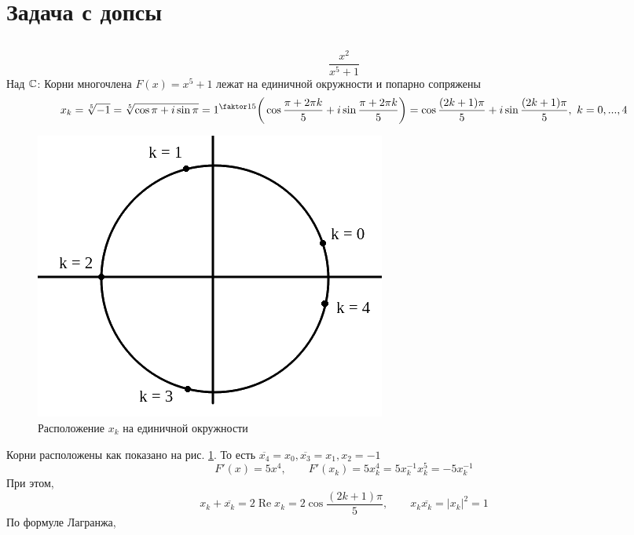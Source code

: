 \section{Задача с допсы}

\subsection{}

$$ \frac{x^2}{x^5 + 1} $$
Над $ \mathbb{C} $:
Корни многочлена $ F(x) = x^5 + 1 $ лежат на единичной окружности и попарно сопряжены
$$ x_k = \sqrt[5]{-1} = \sqrt[5]{\cos\pi + i \sin\pi} = 1^{\faktor15} \bigg( \cos \frac{\pi + 2\pi k}5 + i \sin \frac{\pi + 2\pi k}5 \bigg) = \cos \frac{(2k + 1)\pi}5 + i \sin \frac{(2k + 1)\pi}5, ~ k = 0, ..., 4 $$
\begin{figure}[!ht]
	\includegraphics[scale=0.5]{sqrt_5_1}
    \caption{Расположение $ x_k $ на единичной окружности}
    \label{fig:1}
\end{figure}
Корни расположены как показано на рис. \ref{fig:1}. То есть $ \overline{x_4} = x_0, \overline{x_3} = x_1, x_2 = -1 $
$$ F'(x) = 5x^4, \qquad F'(x_k) = 5x_k^4 = 5x_k^{-1}x_k^5 = -5x_k^{-1} $$
При этом,
$$ x_k + \overline{x_k} = 2\operatorname{Re} x_k = 2\cos \frac{(2k + 1)\pi}5, \qquad x_k\overline{x_k} = |x_k|^2 = 1 $$
По формуле Лагранжа,
